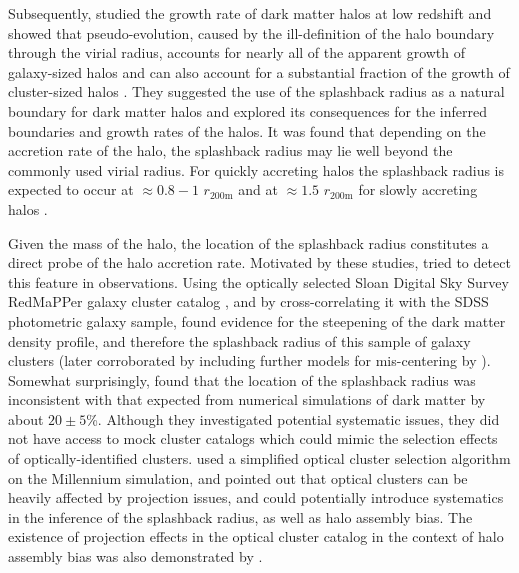 \documentclass[iop, apjl, twocolappendix, numberedappendix]{emulateapj}
\begin{document}
Subsequently, \citet{more2015splashback} studied the
growth rate of dark matter halos at low redshift and showed that
pseudo-evolution, caused by the ill-definition of the halo boundary
through the virial radius, accounts for nearly all of the apparent
growth of galaxy-sized halos and can also account for a substantial
fraction of the growth of cluster-sized halos
\citep{diemer2013pseudo}. They suggested the use of the splashback
radius as a natural boundary for dark matter halos and explored its
consequences for the inferred boundaries and growth rates of the
halos.  It was found that depending on the accretion rate of the
halo, the splashback radius may lie well beyond the commonly used
virial radius. For quickly accreting halos the splashback radius is
expected to occur at $\approx 0.8-1$ $r_{\mathrm{200m}}$ and at
$\approx 1.5$ $r_{\mathrm{200m}}$ for slowly accreting halos
\citep{more2015splashback}.

Given the mass of the halo, the location of the splashback radius
constitutes a direct probe of the halo accretion rate. Motivated by
these studies, \citet{more2016detection} tried to detect this
feature in observations. Using the optically selected Sloan Digital
Sky Survey RedMaPPer galaxy cluster catalog
\citep{rykoff2014redmapper}, and by cross-correlating it with the
SDSS photometric galaxy sample, \citet{more2016detection} found evidence
for the steepening of the dark matter density profile, and therefore
the splashback radius of this sample of galaxy clusters (later
corroborated by including further models for mis-centering by
\citet{baxter2017halo}). Somewhat surprisingly,
\citet{more2016detection} found that the location of the splashback
radius was inconsistent with that expected from numerical
simulations of dark matter by about $20\pm5$\%. Although they
investigated potential systematic issues, they did not have access
to mock cluster catalogs which could mimic the selection effects of
optically-identified clusters. \citet{busch2017assembly} used a
simplified optical cluster selection algorithm on the Millennium
simulation, and pointed out that optical clusters can be heavily
affected by projection issues, and could potentially introduce
systematics in the inference of the splashback radius, as well as
halo assembly bias. The existence of projection effects in the
optical cluster catalog in the context of halo assembly bias was 
also demonstrated by \citet{zu2016level}.
\end{document}
